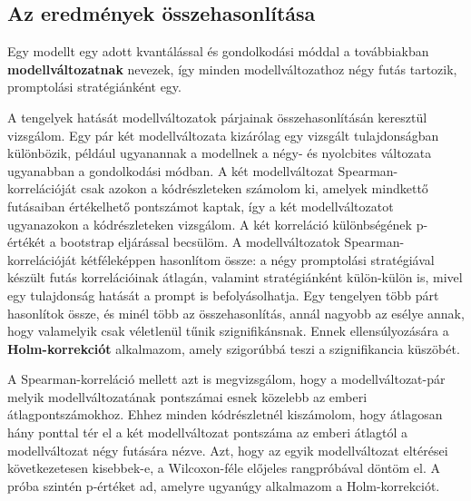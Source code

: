 \documentclass[
]{elteikthesis}[2024/04/26]
\begin{document}
\subsection{Az eredmények összehasonlítása}

Egy modellt egy adott kvantálással és gondolkodási móddal a továbbiakban
\textbf{modellváltozatnak} nevezek, így minden modellváltozathoz négy futás
tartozik, %
promptolási stratégiánként egy.


A tengelyek hatását modellváltozatok párjainak összehasonlításán keresztül
vizsgálom. %
Egy pár két modellváltozata kizárólag egy vizsgált tulajdonságban különbözik,
például ugyanannak a modellnek a négy- és nyolcbites változata ugyanabban a
gondolkodási módban. A két modellváltozat Spearman-korrelációját csak azokon a
kódrészleteken számolom ki, amelyek mindkettő futásaiban értékelhető pontszámot
kaptak, így a két modellváltozatot ugyanazokon a kódrészleteken vizsgálom. A két
korreláció különbségének p-értékét a bootstrap eljárással becsülöm. %
A modellváltozatok Spearman-korrelációját kétféleképpen hasonlítom össze: a négy
promptolási stratégiával készült futás korrelációinak átlagán, valamint
stratégiánként külön-külön is, mivel egy tulajdonság hatását a prompt is
befolyásolhatja. Egy tengelyen több párt hasonlítok össze, és minél több az
összehasonlítás, annál nagyobb az esélye annak, hogy valamelyik csak véletlenül
tűnik szignifikánsnak. Ennek ellensúlyozására a \textbf{Holm-korrekciót}
alkalmazom, amely szigorúbbá teszi a szignifikancia küszöbét.

A Spearman-korreláció mellett azt is megvizsgálom, hogy a modellváltozat-pár
melyik modellváltozatának pontszámai esnek közelebb az emberi
átlagpontszámokhoz. Ehhez minden kódrészletnél kiszámolom, hogy átlagosan hány
ponttal tér el a két modellváltozat pontszáma az emberi átlagtól a
modellváltozat négy futására nézve. Azt, hogy az egyik modellváltozat eltérései
következetesen kisebbek-e, a Wilcoxon-féle előjeles rangpróbával döntöm el. A
próba szintén p-értéket ad, amelyre ugyanúgy alkalmazom a Holm-korrekciót.
\end{document}
